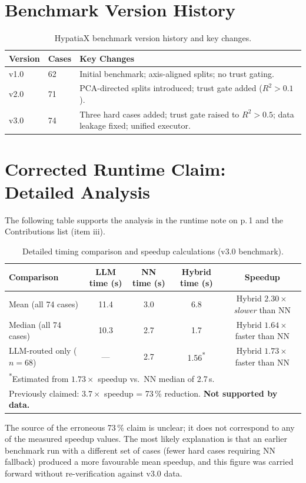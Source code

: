 \documentclass[twoside,11pt]{article}
\newcommand{\Rsq}{R^{2}}
\begin{document}
\section{Benchmark Version History}
\label{app:versions}

\begin{table}[h]
\centering
\caption{HypatiaX benchmark version history and key changes.}
\begin{tabular}{llp{8cm}}
\toprule
Version & Cases & Key Changes \\
\midrule
v1.0 & 62 & Initial benchmark; axis-aligned splits; no trust gating. \\
v2.0 & 71 & PCA-directed splits introduced; trust gate added ($\Rsq > 0.1$). \\
v3.0 & 74 & Three hard cases added; trust gate raised to $\Rsq > 0.5$; data leakage fixed; unified executor. \\
\bottomrule
\end{tabular}
\end{table}

\section{Corrected Runtime Claim: Detailed Analysis}
\label{app:timing}

The following table supports the analysis in the runtime note on p.\,1 and the
Contributions list (item iii).

\begin{table}[h]
\centering
\caption{Detailed timing comparison and speedup calculations (v3.0 benchmark).}
\begin{tabular}{lcccc}
\toprule
Comparison & LLM time (s) & NN time (s) & Hybrid time (s) & Speedup \\
\midrule
Mean (all 74 cases)        & 11.4 & 3.0 & 6.8 & Hybrid $2.30\times$ \emph{slower} than NN \\
Median (all 74 cases)      & 10.3 & 2.7 & 1.7 & Hybrid $1.64\times$ faster than NN \\
LLM-routed only ($n=68$)   & ---  & 2.7 & 1.56\textsuperscript{*} & Hybrid $1.73\times$ faster than NN \\
\midrule
\multicolumn{5}{l}{\textsuperscript{*}Estimated from $1.73\times$ speedup vs.\ NN median of 2.7\,s.} \\
\multicolumn{5}{l}{Previously claimed: $3.7\times$ speedup = 73\,\% reduction. \textbf{Not supported by data.}} \\
\bottomrule
\end{tabular}
\end{table}

\noindent
The source of the erroneous 73\,\% claim is unclear; it does not correspond to
any of the measured speedup values.  The most likely explanation is that an
earlier benchmark run with a different set of cases (fewer hard cases requiring
NN fallback) produced a more favourable mean speedup, and this figure was
carried forward without re-verification against v3.0 data.
\end{document}
